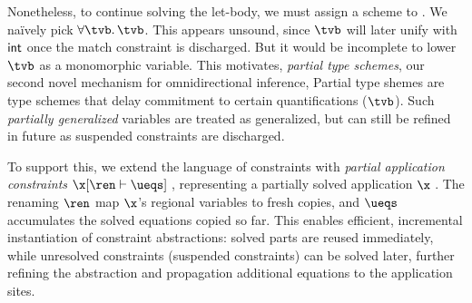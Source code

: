 \documentclass[acmsmall,screen,nonacm,review]{acmart}
\begin{document}

Nonetheless, to continue solving the let-body, we must assign a scheme to
. We na\"ively pick $\tfor \tvb \tvb$. This appears unsound, since
$\tvb$ will later unify with $\mathsf{int}$ once the match constraint is discharged.
But it would be incomplete to lower $\tvb$ as a monomorphic variable.
%
This motivates, \emph{partial type schemes}, our second novel mechanism for
omnidirectional inference, Partial type shemes are type schemes that delay
commitment to certain quantifications (\eg $\tvb$). Such \emph{partially
generalized} variables are treated as generalized, but can still be refined
in future as suspended constraints are discharged.


To support this, we extend the language of constraints with \emph{partial
application constraints} $\cpapp \x \ren \ueqs \t$, representing a partially
solved application $\capp \x \t$. The renaming $\ren$ map $\x$'s regional
variables to fresh copies, and $\ueqs$ accumulates the solved equations copied
so far. This enables efficient, incremental instantiation of constraint
abstractions: solved parts are reused immediately, while unresolved
constraints (\ie suspended constraints) can be solved later, further refining
the abstraction and propagation additional equations to the application sites.
\end{document}
